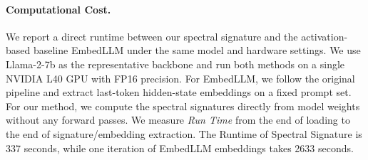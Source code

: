 \paragraph{Computational Cost.}
We report a direct runtime between our spectral signature and the activation-based baseline EmbedLLM under the same model and hardware settings. We use Llama-2-7b as the representative backbone and run both methods on a single NVIDIA L40 GPU with FP16 precision. For EmbedLLM, we follow the original pipeline and extract last-token hidden-state embeddings on a fixed prompt set.
For our method, we compute the spectral signatures directly from model weights without any forward passes. We measure \textit{Run Time} from the end of loading to the end of signature/embedding extraction. The Runtime of Spectral Signature is 337 seconds, while one iteration of EmbedLLM embeddings takes 2633 seconds.


\begin{table}[t]
\centering
\caption{Performance prediction results on four benchmarks, comparing our spectral signature and EmbedLLM in terms of MAE and statistical significance.}
\label{tab:robustness_knn_embedllm}
\setlength{\tabcolsep}{6pt}
\renewcommand{\arraystretch}{1.1}
\label{tab:significance}
\end{table}

